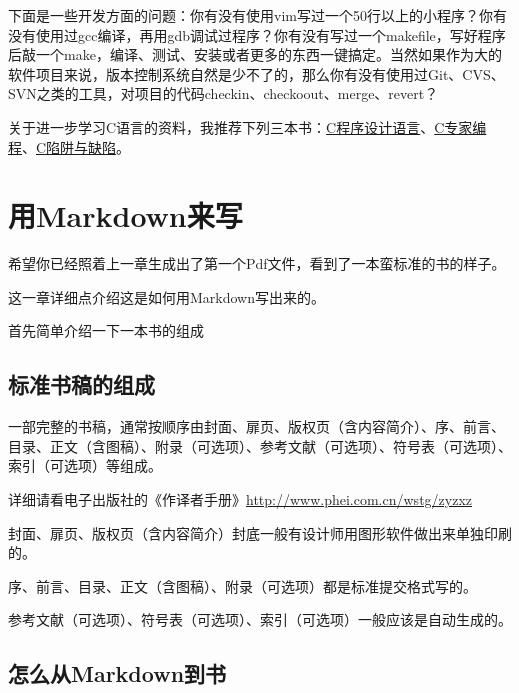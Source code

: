 \documentclass[a4paper]{book}
\newcommand{\chap}[1]{\newpage\thispagestyle{empty}\chapter{#1}\label{chap:\thechapter}}
\begin{document}
下面是一些开发方面的问题：你有没有使用vim写过一个50行以上的小程序？你有没有使用过gcc编译，再用gdb调试过程序？你有没有写过一个makefile，写好程序后敲一个make，编译、测试、安装或者更多的东西一键搞定。当然如果作为大的软件项目来说，版本控制系统自然是少不了的，那么你有没有使用过Git、CVS、SVN之类的工具，对项目的代码checkin、checkoout、merge、revert？

关于进一步学习C语言的资料，我推荐下列三本书：\href{http://www.amazon.cn/C\%E7\%A8\%8B\%E5\%BA\%8F\%E8\%AE\%BE\%E8\%AE\%A1\%E8\%AF\%AD\%E8\%A8\%80-\%E5\%85\%8B\%E5\%B0\%BC\%E6\%B1\%89/dp/B0011C9OMG/ref=sr\_1\_1?ie=UTF8\&qid=1334586907\&sr=8-1}{C程序设计语言}、\href{http://www.amazon.cn/C\%E5\%92\%8CC-\%E7\%BB\%8F\%E5\%85\%B8\%E8\%91\%97\%E4\%BD\%9C\%E2\%80\%A2C\%E4\%B8\%93\%E5\%AE\%B6\%E7\%BC\%96\%E7\%A8\%8BExpert-C-Programming-Deep-C-Secrets-Peter-Van-Der-Linden/dp/B0012NIW9K/ref=sr\_1\_1?s=books\&ie=UTF8\&qid=1334587029\&sr=1-1}{C专家编程}、\href{http://www.amazon.cn/C\%E5\%92\%8CC-\%E7\%BB\%8F\%E5\%85\%B8\%E8\%91\%97\%E4\%BD\%9C\%E2\%80\%A2C\%E9\%99\%B7\%E9\%98\%B1\%E4\%B8\%8E\%E7\%BC\%BA\%E9\%99\%B7-Andrew-Koenig/dp/B0012NIW72/ref=pd\_sim\_b\_1}{C陷阱与缺陷}。

\chap{用Markdown来写}

希望你已经照着上一章生成出了第一个Pdf文件，看到了一本蛮标准的书的样子。

这一章详细点介绍这是如何用Markdown写出来的。

首先简单介绍一下一本书的组成

\section{标准书稿的组成}

一部完整的书稿，通常按顺序由封面、扉页、版权页（含内容简介）、序、前言、目录、正文（含图稿）、附录（可选项）、参考文献（可选项）、符号表（可选项）、索引（可选项）等组成。

详细请看电子出版社的《作译者手册》\url{http://www.phei.com.cn/wstg/zyzxz}

封面、扉页、版权页（含内容简介）封底一般有设计师用图形软件做出来单独印刷的。

序、前言、目录、正文（含图稿）、附录（可选项）都是标准提交格式写的。

参考文献（可选项）、符号表（可选项）、索引（可选项）一般应该是自动生成的。

\section{怎么从Markdown到书}
\end{document}
